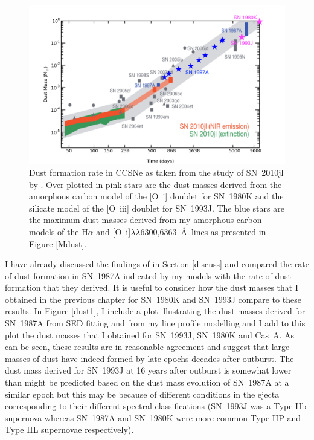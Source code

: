\begin{figure}
\centering
\includegraphics[scale=0.55,clip=true, trim=50 -20 60 0]{chapters/chapter7/figs/final_dust_plot2.png}
\caption{Dust formation rate in CCSNe as taken from the study of SN~2010jl by \citet{Gall2014}.  Over-plotted in pink stars are the dust masses derived from the amorphous carbon model of the [O~{\sc i}] doublet for SN~1980K and the silicate model of the [O~{\sc iii}] doublet for SN~1993J.  The blue stars are the maximum dust masses derived from my amorphous carbon models of the H$\alpha$ and [O~{\sc i}]$\lambda\lambda$6300,6363~\AA\ lines as presented in Figure \ref{Mdust}.}
\label{dust2}
\end{figure}

I have already discussed the findings of \citet{Wesson2015} in Section \ref{discuss} and compared the rate of dust formation in SN~1987A indicated by my models with the rate of dust formation that they derived.  It is useful to consider how the dust masses that I obtained in the previous chapter for SN~1980K and SN~1993J compare to these results.  In Figure \ref{dust1}, I include a plot illustrating the dust masses derived for SN~1987A from SED fitting and from my line profile modelling and I add to this plot the dust masses that I obtained for SN~1993J, SN~1980K and Cas~A.  As can be seen, these results are in reasonable agreement and suggest that large masses of dust have indeed formed by late epochs decades after outburst.  The dust mass derived for SN~1993J at 16 years after outburst is somewhat lower than might be predicted based on the dust mass evolution of SN~1987A at a similar epoch but this may be because of different conditions in the ejecta corresponding to their different spectral classifications (SN~1993J was a Type IIb supernova whereas SN~1987A and SN~1980K were more common Type IIP and Type IIL supernovae respectively).

